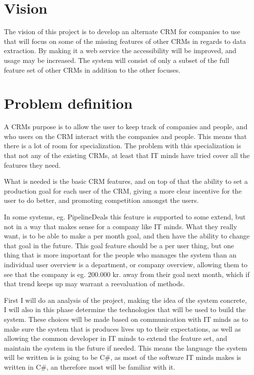 \section{Vision}
\label{sec:Vision}
The vision of this project is to develop an alternate CRM for companies to use
that will focus on some of the missing features of other CRMs in regards to data
extraction. By making it a web service the accessibility will be improved, and
usage may be increased. The system will consist of only a subset of the full
feature set of other CRMs in addition to the other focuses. 

\section{Problem definition}
\label{sec:Problem definition}
A CRMs purpose is to allow the user to keep track of companies and people, and
who users on the CRM interact with the companies and people. This means that
there is a lot of room for specialization. The problem with this specialization
is that not any of the existing CRMs, at least that IT minds have tried cover
all the features they need. 

What is needed is the basic CRM features, and on top of that the ability to set
a production goal for each user of the CRM, giving a more clear incentive for
the user to do better, and promoting competition amongst the users. 

In some systems, eg. PipelineDeals\cite{pipelinedeals:features} this feature is
supported to some extend, but not in a way that makes sense for a company like
IT minds. What they really want, is to be able to make a per month goal, and
then have the ability to change that goal in the future. This goal feature
should be a per user thing, but one thing that is more important for the people
who manages the system than an individual user overview is a department, or
company overview, allowing them to see that the company is eg. 200.000 kr. away
from their goal next month, which if that trend keeps up may warrant a
reevaluation of methods. 

First I will do an analysis of the project, making the idea of the system
concrete, I will also in this phase determine the technologies that will be used
to build the system. These choices will be made based on communication with IT
minds as to make sure the system that is produces lives up to their
expectations, as well as allowing the common developer in IT minds to extend the
feature set, and maintain the system in the future if needed. This means the
language the system will be written is is going to be C\#, as most of the
software IT minds makes is written in C\#, an therefore most will be familiar
with it. 

